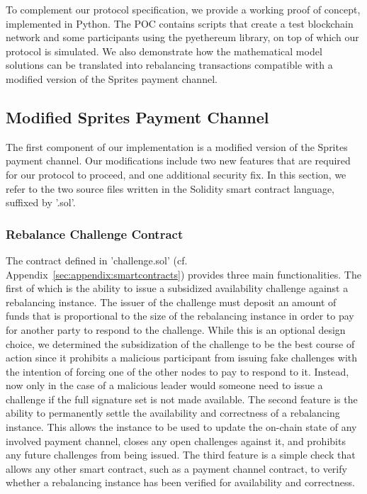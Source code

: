 \documentclass[sigconf]{acmart}
\begin{document}
To complement our protocol specification, we provide a working proof of concept, implemented in Python. The POC contains scripts that create a test blockchain network and some participants using the pyethereum library, on top of which our protocol is simulated. We also demonstrate how the mathematical model solutions can be translated into rebalancing transactions compatible with a modified version of the Sprites payment channel.

\subsection{Modified Sprites Payment Channel}
The first component of our implementation is a modified version of the Sprites~\cite{sprites} payment channel. Our modifications include two new features that are required for our protocol to proceed, and one additional security fix. In this section, we refer to the two source files written in the Solidity smart contract language, suffixed by '.sol'.

\subsubsection{Rebalance Challenge Contract}

The contract defined in 'challenge.sol' (cf. Appendix~\ref{sec:appendix:smartcontracts}) provides three main functionalities. The first of which is the ability to issue a subsidized availability challenge against a rebalancing instance. The issuer of the challenge must deposit an amount of funds that is proportional to the size of the rebalancing instance in order to pay for another party to respond to the challenge.
While this is an optional design choice, we determined the subsidization of the challenge to be the best course of action since it prohibits a malicious participant from issuing fake challenges with the intention of forcing one of the other nodes to pay to respond to it. Instead, now only in the case of a malicious leader would someone need to issue a challenge if the full signature set is not made available.
The second feature is the ability to permanently settle the availability and correctness of a rebalancing instance. This allows the instance to be used to update the on-chain state of any involved payment channel, closes any open challenges against it, and prohibits any future challenges from being issued.
The third feature is a simple check that allows any other smart contract, such as a payment channel contract, to verify whether a rebalancing instance has been verified for availability and correctness.
\end{document}
